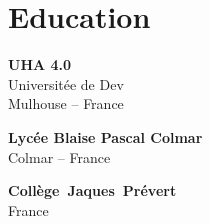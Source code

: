 \documentclass[a4paper,10pt]{article}
\begin{document}
\begin{adjustbox}{valign=t}
\begin{minipage}{0.3\textwidth}
\vfill

\section*{Education}
	\begin{description}
	\raggedright
    \item [\normalfont \textcolor{ColorOne}{2017 - 2020.}] \textbf{UHA 4.0}\\
			Universitée de Dev\\
	Mulhouse -- France
    \item \textbf{Lycée Blaise Pascal Colmar}\\
	Colmar -- France

    \item \mbox{\textbf{Collège Jaques Prévert}}\\
	France
\end{description}

\vfill
\end{minipage}
\end{adjustbox}
%
%
%
\hfill
\begin{adjustbox}{valign=t}
\begin{minipage}{0.05\textwidth} %
\MyVerticalRule  %
\end{minipage}
\end{adjustbox}
\hfill
%
\end{document}
